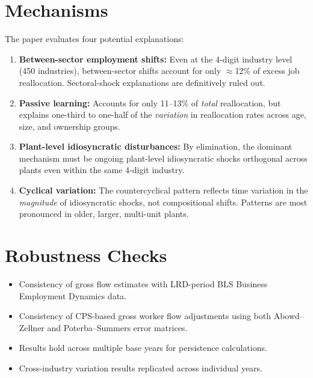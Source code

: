 \section{Mechanisms}

The paper evaluates four potential explanations:

\begin{enumerate}
  \item \textbf{Between-sector employment shifts:} Even at the 4-digit
    industry level (450 industries), between-sector shifts account for only
    $\approx$12\% of excess job reallocation. Sectoral-shock explanations
    are definitively ruled out.

  \item \textbf{Passive learning:} Accounts for only 11--13\% of \emph{total}
    reallocation, but explains one-third to one-half of the \emph{variation}
    in reallocation rates across age, size, and ownership groups.

  \item \textbf{Plant-level idiosyncratic disturbances:} By elimination, the
    dominant mechanism must be ongoing plant-level idiosyncratic shocks
    orthogonal across plants even within the same 4-digit industry.

  \item \textbf{Cyclical variation:} The countercyclical pattern reflects
    time variation in the \emph{magnitude} of idiosyncratic shocks, not
    compositional shifts. Patterns are most pronounced in older, larger,
    multi-unit plants.
\end{enumerate}

\section{Robustness Checks}

\begin{itemize}
  \item Consistency of gross flow estimates with LRD-period BLS Business
    Employment Dynamics data.
  \item Consistency of CPS-based gross worker flow adjustments using both
    Abowd--Zellner and Poterba--Summers error matrices.
  \item Results hold across multiple base years for persistence calculations.
  \item Cross-industry variation results replicated across individual years.
\end{itemize}

